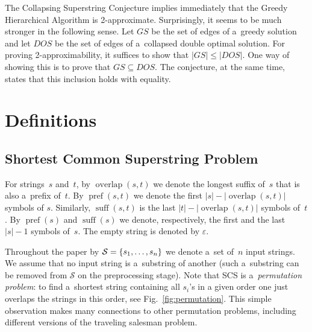 \documentclass[11pt,letterpaper]{article}
\DeclareMathOperator{\overlap}{overlap}
\DeclareMathOperator{\pref}{pref}
\DeclareMathOperator{\suff}{suff}
\begin{document}
The Collapsing Superstring Conjecture implies immediately that the Greedy
Hierarchical Algorithm is 2-approximate. Surprisingly, it seems to be much
stronger in the following sense. Let $GS$ be the set of edges of a~greedy
solution and let $DOS$ be the set of edges of a~collapsed double optimal
solution. For proving 2-approximability, it suffices to show that $|GS| \le |DOS|$. 
One way of showing this is to prove that $GS \subseteq DOS$. 
The conjecture, at the same time, states that this inclusion holds with equality.


\section{Definitions}
\subsection{Shortest Common Superstring Problem}
For strings~$s$ and~$t$, by $\overlap(s,t)$
we denote the longest suffix of~$s$ that is also 
a~prefix of~$t$. By $\pref(s,t)$
we denote the first $|s|-|\overlap(s,t)|$ symbols of $s$.
Similarly, $\suff(s,t)$ is the last
$|t|-|\overlap(s,t)|$ symbols of~$t$. 
By $\pref(s)$ and $\suff(s)$ we denote, respectively,
the first and the last $|s|-1$ symbols of~$s$.
The empty string is denoted by $\varepsilon$.

Throughout the paper by ${\cal S}=\{s_1, \dots, s_n\}$ we denote
a~set of~$n$ input strings. We assume that no input string is a~substring of another (such a~substring can be removed from $\mathcal{S}$ on the preprocessing stage). Note that SCS is a~{\em permutation problem}: to find a~shortest string containing all $s_i$'s in a given order one just
overlaps the strings in this order, see Fig.~\ref{fig:permutation}. This simple observation makes many connections to other permutation problems, including different versions of the traveling salesman problem.
\end{document}
